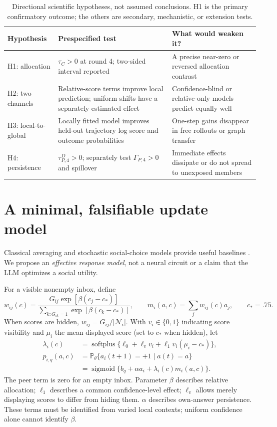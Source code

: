 \documentclass[11pt]{article}
\newcommand{\Prob}{\mathbb P}
\newcommand{\sigm}{\operatorname{sigmoid}}
\newcommand{\spplus}{\operatorname{softplus}}
\newcommand{\calN}{\mathcal N}
\begin{document}
\begin{table}[t]
\centering\small
\begin{tabularx}{\linewidth}{@{}p{.10\linewidth}YY@{}}
\toprule
Hypothesis & Prespecified test & What would weaken it? \\
\midrule
H1: allocation & $\tau_C>0$ at round 4; two-sided interval reported & A precise near-zero or reversed allocation contrast \\
H2: two channels & Relative-score terms improve local prediction; uniform shifts have a separately estimated effect & Confidence-blind or relative-only models predict equally well \\
H3: local-to-global & Locally fitted model improves held-out trajectory log score and outcome probabilities & One-step gains disappear in free rollouts or graph transfer \\
H4: persistence & $\tau_{P,4}^D>0$; separately test $\Gamma_{P,4}>0$ and spillover & Immediate effects dissipate or do not spread to unexposed members \\
\bottomrule
\end{tabularx}
\caption{Directional scientific hypotheses, not assumed conclusions. H1 is the primary confirmatory outcome; the others are secondary, mechanistic, or extension tests.}
\end{table}

\section{A minimal, falsifiable update model}
\label{sec:model}
Classical averaging and stochastic social-choice models provide useful baselines \citep{degroot1974consensus,brock2001social}. We propose an \emph{effective response model}, not a neural circuit or a claim that the LLM optimizes a social utility.

For a visible nonempty inbox, define
\begin{equation}
 w_{ij}(c)=\frac{G_{ij}\exp[\beta(c_j-c_*)]}{\sum_{k:G_{ik}=1}\exp[\beta(c_k-c_*)]},\qquad
 m_i(a,c)=\sum_jw_{ij}(c)a_j,\qquad c_*=.75.
 \label{eq:weights}
\end{equation}
When scores are hidden, $w_{ij}=G_{ij}/|\calN_i|$. With $v_i\in\{0,1\}$ indicating score visibility and $\mu_i$ the mean displayed score (set to $c_*$ when hidden), let
\begin{align}
 \lambda_i(c)&=\spplus\{\ell_0+\ell_vv_i+\ell_1v_i(\mu_i-c_*)\},\label{eq:lambda}\\
 p_{i,q}(a,c)&=\Prob_\theta\{a_i(t+1)=+1\mid a(t)=a\}\\
 &=\sigm\{b_q+\alpha a_i+\lambda_i(c)m_i(a,c)\}.
 \label{eq:kernel}
\end{align}
The peer term is zero for an empty inbox. Parameter $\beta$ describes relative allocation; $\ell_1$ describes a common confidence-level effect; $\ell_v$ allows merely displaying scores to differ from hiding them. $\alpha$ describes own-answer persistence. These terms must be identified from varied local contexts; uniform confidence alone cannot identify $\beta$.
\end{document}

